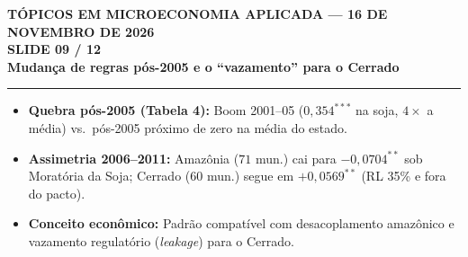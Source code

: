 \documentclass[11pt,a4paper]{article}
\newcommand{\slidenum}{1}
\begin{document}
\newpage

\renewcommand{\slidenum}{9}
\noindent
\begin{minipage}{\textwidth}
\begin{center}
{\color{cinza}\footnotesize\textbf{TÓPICOS EM MICROECONOMIA APLICADA --- 16 DE NOVEMBRO DE 2026}\\[1.2mm]}
{\color{cinza}\bfseries\Large SLIDE 09 / 12\\[1.5mm]}
{\color{verde}\bfseries\LARGE Mudança de regras pós-2005 e o ``vazamento'' para o Cerrado\\[2.5mm]}
\rule{\textwidth}{1pt}
\end{center}
\end{minipage}
\vspace{1.5mm}

\begin{tcolorbox}[title={\bfseries\small ÂNCORAS DO SLIDE}]
\begin{itemize}[leftmargin=*,itemsep=1mm,topsep=0.5mm]
    \item \textbf{Quebra pós-2005 (Tabela 4):} Boom 2001--05 ($0{,}354^{***}$ na soja, $4\times$ a média) vs.\ pós-2005 próximo de zero na média do estado.
    \item \textbf{Assimetria 2006--2011:} Amazônia ($71$ mun.) cai para $-0{,}0704^{**}$ sob Moratória da Soja; Cerrado ($60$ mun.) segue em $+0{,}0569^{**}$ (RL 35\% e fora do pacto).
    \item \textbf{Conceito econômico:} Padrão compatível com desacoplamento amazônico e vazamento regulatório (\textit{leakage}) para o Cerrado.
\end{itemize}
\end{tcolorbox}
\vspace{2mm}
\end{document}
